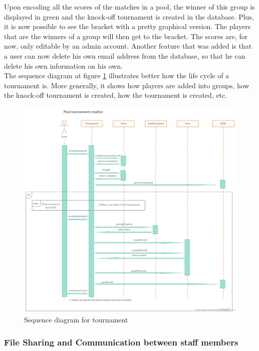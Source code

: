 \documentclass[a4paper, 12pt]{article}
\begin{document}
Upon encoding all the scores of the matches in a pool, the winner of this group is displayed in green and the knock-off tournament is created in the database. Plus, it is now possible to see the bracket with a pretty graphical version. The players that are the winners of a group will then get to the bracket. The scores are, for now, only editable by an admin account. Another feature that was added is that a user can now delete his own email address from the database, so that he can delete his own information on his own.\\

The sequence diagram at figure \ref{tournseq} illustrates better how the life cycle of a tournament is. More generally, it shows how players are added into groups, how the knock-off tournament is created, how the tournament is created, etc.\\

\begin{figure}[h]
   \caption{\label{tournseq} Sequence diagram for tournament}
  \includegraphics[scale=0.4]{Tournament.png}
\end{figure}
\FloatBarrier
\newpage
\subsubsection*{File Sharing and Communication between staff members}
\end{document}
